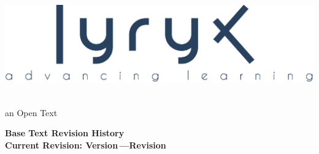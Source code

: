 \setcounter{page}{1}
\thispagestyle{empty}


\vspace{-3em}
\begin{center}
	\includegraphics[width=.4\textwidth]{figures/LyryxLogo.eps}
\end{center}

\vspace{-2em}

\begin{center}
 {\fontsize{24pt}{22pt}\selectfont \textcolor{titletextcolour}{\booksubtitle\;\booktitle}} \\ 
{\fontsize{16pt}{20pt}\selectfont \textcolor{titlemainbgcolour}{an Open Text}} %

\medskip

\end{center}

\setlength{\parskip}{0pt}

\begin{center}
\fontsize{12pt}{14pt}\selectfont\textcolor{titletextcolour}{\textbf{Base Text Revision History \\ \smallskip  Current Revision: Version\,\version \enskip---\enskip Revision\,\revision }}
\end{center}

